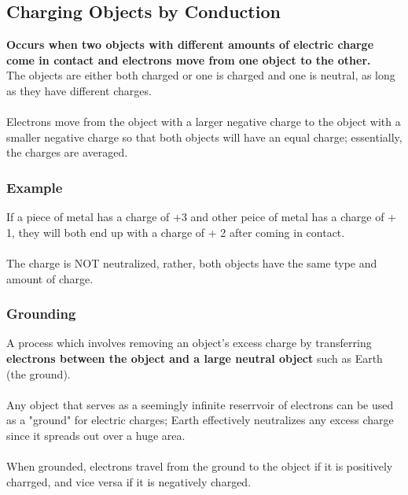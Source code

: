\documentclass{article}
\begin{document}
    \subsection*{Charging Objects by Conduction}
    \textbf{Occurs when two objects with different amounts of electric charge come in contact and electrons move from one object to the other.}\\
    The objects are either both charged or one is charged and one is neutral, as long as they have different charges.\\\\
    Electrons move from the object with a larger negative charge to the object with a smaller negative charge so that both objects will have an equal charge; essentially, the charges are averaged.\\

    \subsubsection*{Example}
    If a piece of metal has a charge of +3 and other peice of metal has a charge of + 1, they will both end up with a charge of + 2 after coming in contact.\\\\
    The charge is NOT neutralized, rather, both objects have the same type and amount of charge. \\
   
    \subsubsection*{Grounding}
    A process which involves removing an object's excess charge by transferring \textbf{electrons between the object and a large neutral object} such as Earth (the ground). \\\\
    Any object that serves as a seemingly infinite reserrvoir of electrons can be used as a "ground" for electric charges; Earth effectively neutralizes any excess charge since it spreads out over a huge area.\\\\
    When grounded, electrons travel from the ground to the object if it is positively charrged, and vice versa if it is negatively charged.\\
\end{document}
